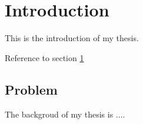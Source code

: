 \section{Introduction}
\label{ch:introduction}

This is the introduction of my thesis.

Reference to section \ref{ch:introduction}

\subsection{Problem}

The backgroud of my thesis is ....